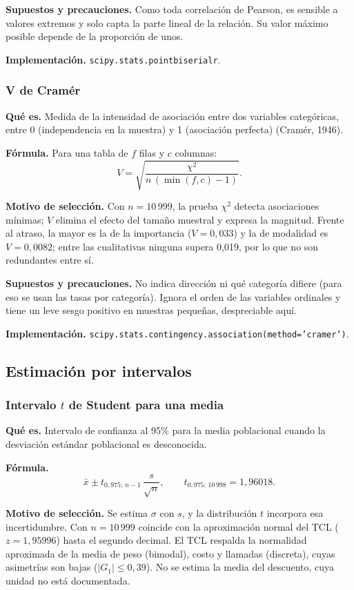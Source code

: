 \documentclass[10pt,a4paper]{article}
\begin{document}
\textbf{Supuestos y precauciones.} Como toda correlación de Pearson, es sensible a valores extremos y solo capta la parte lineal de la relación. Su valor máximo posible depende de la proporción de unos.

\textbf{Implementación.} \texttt{scipy.stats.pointbiserialr}.

\subsubsection{V de Cramér}
\textbf{Qué es.} Medida de la intensidad de asociación entre dos variables categóricas, entre 0 (independencia en la muestra) y 1 (asociación perfecta) (Cramér, 1946).

\textbf{Fórmula.} Para una tabla de $f$ filas y $c$ columnas:
\[
V=\sqrt{\frac{\chi^2}{n\,(\min(f,c)-1)}}.
\]

\textbf{Motivo de selección.} Con $n=10\,999$, la prueba $\chi^2$ detecta asociaciones mínimas; $V$ elimina el efecto del tamaño muestral y expresa la magnitud. Frente al atraso, la mayor es la de la importancia ($V=0{,}033$) y la de modalidad es $V=0{,}0082$; entre las cualitativas ninguna supera 0,019, por lo que no son redundantes entre sí.

\textbf{Supuestos y precauciones.} No indica dirección ni qué categoría difiere (para eso se usan las tasas por categoría). Ignora el orden de las variables ordinales y tiene un leve sesgo positivo en muestras pequeñas, despreciable aquí.

\textbf{Implementación.} \texttt{scipy.stats.contingency.association(method='cramer')}.

\subsection{Estimación por intervalos}

\subsubsection{Intervalo \texorpdfstring{$t$}{t} de Student para una media}
\textbf{Qué es.} Intervalo de confianza al 95\% para la media poblacional cuando la desviación estándar poblacional es desconocida.

\textbf{Fórmula.}
\[
\bar x\pm t_{0{,}975;\,n-1}\,\frac{s}{\sqrt n},\qquad t_{0{,}975;\,10\,998}=1{,}96018.
\]

\textbf{Motivo de selección.} Se estima $\sigma$ con $s$, y la distribución $t$ incorpora esa incertidumbre. Con $n=10\,999$ coincide con la aproximación normal del TCL ($z=1{,}95996$) hasta el segundo decimal. El TCL respalda la normalidad aproximada de la media de peso (bimodal), costo y llamadas (discreta), cuyas asimetrías son bajas ($|G_1|\le0{,}39$). No se estima la media del descuento, cuya unidad no está documentada.
\end{document}
